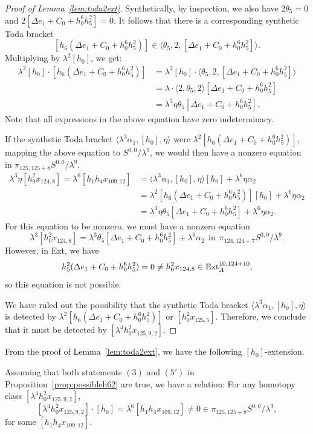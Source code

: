 \begin{proof}[Proof of Lemma~\ref{lem:toda2ext}]
Synthetically, by inspection, we also have $2\theta_5=0$ and $2 [\Delta e_1 +C_0+h_0^6h_5^2] = 0$. It follows that there is a corresponding synthetic Toda bracket
$$[h_6(\Delta e_1 +C_0+h_0^6h_5^2)] \in \langle \theta_5, 2, [\Delta e_1 +C_0+h_0^6h_5^2] \rangle.$$
Multiplying by $\lambda^2 [h_0]$, we get:
\begin{align*}
    \lambda^2 [h_0] \cdot [h_6(\Delta e_1 +C_0+h_0^6h_5^2)]& = \lambda^2 [h_0] \cdot \langle \theta_5, 2, [\Delta e_1 +C_0+h_0^6h_5^2] \rangle \\
    & = \lambda \cdot \langle 2, \theta_5, 2 \rangle [\Delta e_1 +C_0+h_0^6h_5^2]\\
    & = \lambda^3 \eta \theta_5 [\Delta e_1 +C_0+h_0^6h_5^2].
\end{align*}
Note that all expressions in the above equation have zero indeterminacy. 

If the synthetic Toda bracket $\langle \lambda^3 \alpha_1, [h_0], \eta \rangle$ were $\lambda^2 [h_6(\Delta e_1 +C_0+h_0^6h_5^2)]$, mapping the above equation to $S^{0,0}/\lambda^9$, we would then have a nonzero equation in $\pi_{125,125+8} S^{0,0}/\lambda^9$.
\begin{align*}
    \lambda^3 \eta [h_0^2 x_{124,8}] = \lambda^6 [h_1h_4x_{109,12}] & = \langle \lambda^3 \alpha_1, [h_0], \eta \rangle [h_0] + \lambda^6 \eta \alpha_2 \\ & = \lambda^2 [h_6(\Delta e_1 +C_0+h_0^6h_5^2)] [h_0] + \lambda^6 \eta \alpha_2\\ & = \lambda^3 \eta \theta_5 [\Delta e_1 +C_0+h_0^6h_5^2] + \lambda^6 \eta \alpha_2.
\end{align*}
For this equation to be nonzero, we must have a nonzero equation
$$\lambda^3 [h_0^2 x_{124,8}] = \lambda^3 \theta_5 [\Delta e_1 +C_0+h_0^6h_5^2] + \lambda^6 \alpha_2 \ \ \text{in} \ \ \pi_{124,124+7} S^{0,0}/\lambda^9.$$
However, in Ext, we have 
$$h_5^2 (\Delta e_1 +C_0+h_0^6h_5^2) = 0 \neq h_0^2 x_{124,8} \in \mathrm{Ext}_A^{10,124+10},$$
so this equation is not possible.


We have ruled out the possibility that the synthetic Toda bracket $\langle \lambda^3 \alpha_1, [h_0], \eta \rangle$ is detected by $\lambda^2 [h_6(\Delta e_1 +C_0+h_0^6h_5^2)]$ or $[h_0^2 x_{125,5}]$. Therefore, we conclude that it must be detected by $[\lambda^4 h_0^2 x_{125,9,2}]$.
\end{proof}

From the proof of Lemma~\ref{lem:toda2ext}, we have the following $[h_0]$-extension.

\begin{corollary} \label{cor:2ext125}
    Assuming that both statements $(3)$ and $(5')$ in Proposition~\ref{prop:possibleh62} are true, we have a relation: For any homotopy class $[\lambda^4 h_0^2x_{125,9,2}]$,
    $$[\lambda^4 h_0^2x_{125,9,2}] \cdot [h_0] = \lambda^6 [h_1h_4x_{109,12}] \neq 0 \in \pi_{125,125+8} S^{0,0}/\lambda^9,$$
    for some $[h_1h_4x_{109,12}]$.
\end{corollary}

